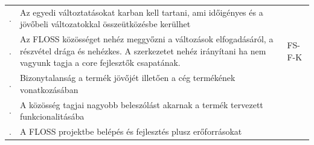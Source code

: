 \documentclass[12pt,magyar,a4paper,oneside]{scrreprt}
\begin{document}
\begin{longtable}[]{@{}lll@{}}
\begin{minipage}[t]{0.24\columnwidth}\raggedright
.\strut
\end{minipage} & \begin{minipage}[t]{0.49\columnwidth}\raggedright
Az egyedi változtatásokat karban kell tartani, ami időigényes és a
jövőbeli változatokkal összeütközésbe kerülhet\strut
\end{minipage} & \begin{minipage}[t]{0.18\columnwidth}\raggedright
\strut
\end{minipage}\tabularnewline
\begin{minipage}[t]{0.24\columnwidth}\raggedright
.\strut
\end{minipage} & \begin{minipage}[t]{0.49\columnwidth}\raggedright
Az FLOSS közösséget nehéz meggyőzni a változások elfogadásáról, a
részvétel drága és nehézkes. A szerkezetet nehéz irányítani ha nem
vagyunk tagja a core fejlesztők csapatának.\strut
\end{minipage} & \begin{minipage}[t]{0.18\columnwidth}\raggedright
FS-F-K\strut
\end{minipage}\tabularnewline
\begin{minipage}[t]{0.24\columnwidth}\raggedright
.\strut
\end{minipage} & \begin{minipage}[t]{0.49\columnwidth}\raggedright
Bizonytalanság a termék jövőjét illetően a cég termékének
vonatkozásában\strut
\end{minipage} & \begin{minipage}[t]{0.18\columnwidth}\raggedright
\strut
\end{minipage}\tabularnewline
\begin{minipage}[t]{0.24\columnwidth}\raggedright
.\strut
\end{minipage} & \begin{minipage}[t]{0.49\columnwidth}\raggedright
A közösség tagjai nagyobb beleszólást akarnak a termék tervezett
funkcionalitásába\strut
\end{minipage} & \begin{minipage}[t]{0.18\columnwidth}\raggedright
\strut
\end{minipage}\tabularnewline
\begin{minipage}[t]{0.24\columnwidth}\raggedright
.\strut
\end{minipage} & \begin{minipage}[t]{0.49\columnwidth}\raggedright
A FLOSS projektbe belépés és fejlesztés plusz erőforrásokat

\end{minipage}
\end{longtable}
\end{document}
